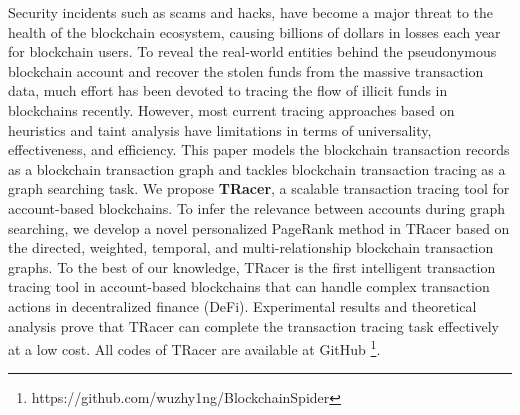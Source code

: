 Security incidents such as scams and hacks, have become a major threat to the health of the blockchain ecosystem, causing billions of dollars in losses each year for blockchain users.
To reveal the real-world entities behind the pseudonymous blockchain account and recover the stolen funds from the massive transaction data, much effort has been devoted to tracing the flow of illicit funds in blockchains recently.
However, most current tracing approaches based on heuristics and taint analysis have limitations in terms of universality, effectiveness, and efficiency. This paper models the blockchain transaction records as a blockchain transaction graph and tackles blockchain transaction tracing as a graph searching task. 
We propose \textbf{TRacer}, a scalable transaction tracing tool for account-based blockchains. 
To infer the relevance between accounts during graph searching, we develop a novel personalized PageRank method in TRacer based on the directed, weighted, temporal, and multi-relationship blockchain transaction graphs. 
To the best of our knowledge, TRacer is the first intelligent transaction tracing tool in account-based blockchains that can handle complex transaction actions in decentralized finance (DeFi).
Experimental results and theoretical analysis prove that TRacer can complete the transaction tracing task effectively at a low cost. 
All codes of TRacer are available at GitHub \footnote{https://github.com/wuzhy1ng/BlockchainSpider}.
